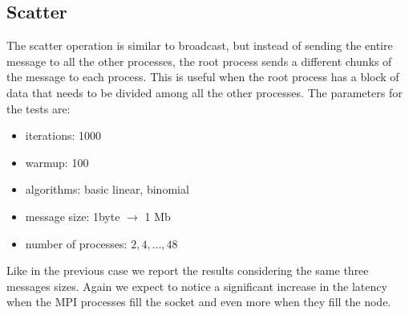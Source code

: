     

\subsection{Scatter}
    The scatter operation is similar to broadcast, but instead of sending
    the entire message to all the other processes, the root process
    sends a different chunks of the message to each process. This is useful
    when the root process has a block of data that needs to be divided
    among all the other processes.
    The parameters for the tests are:
    \begin{itemize}
        \item iterations: 1000
        \item warmup: 100
        \item algorithms: basic linear, binomial
        \item message size: 1byte $\rightarrow$ 1 Mb
        \item number of processes: $2, 4, \dots, 48$
    \end{itemize}
    Like in the previous case we report the results considering the same
    three messages sizes. Again we expect to notice a significant increase
    in the latency when the MPI processes fill the socket and even more
    when they fill the node.
